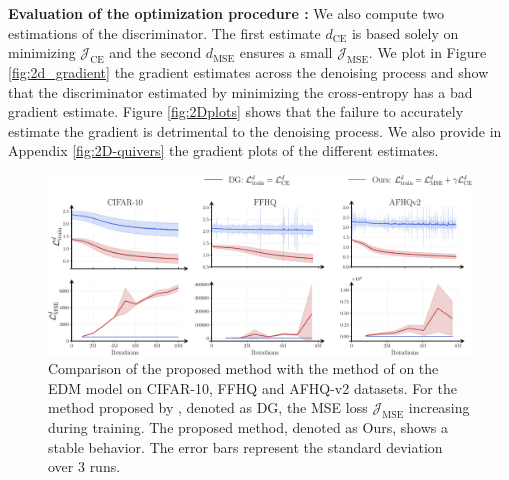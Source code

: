 \textbf{Evaluation of the optimization procedure :}
We also compute two estimations of the discriminator. The first estimate $d_{\mathrm{CE}}$ is based solely on minimizing $\mathcal{J}_{\mathrm{CE}}$ and the second $d_{\mathrm{MSE}}$ ensures a small $\mathcal{J}_{\mathrm{MSE}}$. We plot in Figure \ref{fig:2d_gradient} the gradient estimates across the denoising process and show that the discriminator estimated by minimizing the cross-entropy has a bad gradient estimate. Figure \ref{fig:2Dplots} shows that the failure to accurately estimate the gradient is detrimental to the denoising process. We also provide in Appendix \ref{fig:2D-quivers} the gradient plots of the different estimates.
\begin{figure}[b!]
    \centering
    \includegraphics[width=\textwidth]{gfx/losses_DGvsOurs.pdf}
    \caption{Comparison of the proposed method with the method of \citet{kim2023refininggenerativeprocessdiscriminator} on the EDM model \citep{karras} on CIFAR-10, FFHQ and AFHQ-v2 datasets. For the method proposed by \citet{kim2023refininggenerativeprocessdiscriminator}, denoted as DG, the MSE loss $\mathcal{J}_{\mathrm{MSE}}$ increasing during training. The proposed method, denoted as Ours, shows a stable behavior. The error bars represent the standard deviation over 3 runs.}
    \label{fig:losses}
\end{figure}
